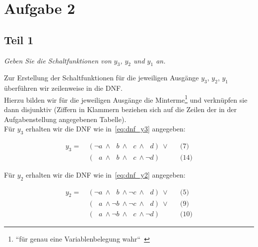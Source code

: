 \chapter{Aufgabe 2}

\section{Teil 1}

\textit{Geben Sie die Schaltfunktionen von $y_3$, $y_2$ und $y_1$ an.}\\


\noindent

\noindent
Zur Erstellung der Schaltfunktionen für die jeweiligen Ausgänge $y_3$, $y_2$, $y_1$ überführen wir zeilenweise in die DNF.\\
Hierzu bilden wir für die jeweiligen Ausgänge die Minterme\footnote{
    ``für genau eine Variablenbelegung wahr``~\cite[92]{Hof22}
} und verknüpfen sie dann disjunktiv (Ziffern in Klammern beziehen sich auf die Zeilen der in der Aufgabenstellung angegebenen Tabelle).\\

\noindent
Für $y_3$ erhalten wir die DNF wie in~\ref{eq:dnf_y3} angegeben:


\begin{equation}\label{eq:dnf_y3}
\begin{alignat}{3}
    y_3 =\ &(\neg a \ \land \phantom{\neg} b \ \land \phantom{\neg} c \ \land \phantom{\neg} d)\ \lor && \text{(7)} \\
          &(\phantom{\neg} a \ \land \phantom{\neg} b \ \land \phantom{\neg} c \ \land \neg d) && \text{(14)}
\end{alignat}
\end{equation}

\noindent
Für $y_2$ erhalten wir die DNF wie in~\ref{eq:dnf_y2} angegeben:


\begin{equation}\label{eq:dnf_y2}
\begin{alignat}{3}
    y_2 =\ &(\neg a \ \land \phantom{\neg} b \ \land \neg c \ \land \phantom{\neg} d)\ \lor && \text{(5)} \\
    &(\phantom{\neg} a \ \land \neg b \ \land \neg c \ \land \phantom{\neg} d)\ \lor && \text{(9)}  \\
    &(\phantom{\neg} a \ \land \neg b \ \land  \phantom{\neg} c \ \land \neg d) && \text{(10)}
\end{alignat}
\end{equation}

